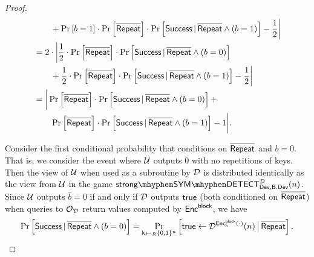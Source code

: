 \begin{proof}
\begin{align}
	& \qquad + \prob{b=1}\cdot\prob{\pneg{\rep}}\cdot \condprob{\success}{\pneg{\rep}\pand(b=1)} - \frac{1}{2} \bigg\vert \nonumber \\ 
	& = 2\cdot\bigg\vert \frac{1}{2}\cdot\prob{\pneg{\rep}}\cdot \condprob{\success}{\pneg{\rep}\pand(b=0)} \nonumber \\
	& \qquad + \frac{1}{2}\cdot\prob{\pneg{\rep}}\cdot \condprob{\success}{\pneg{\rep}\pand(b=1)} - \frac{1}{2} \bigg\vert \nonumber \\
	& = \bigg\vert \prob{\pneg{\rep}}\cdot \condprob{\success}{\pneg{\rep}\pand(b=0)} + \nonumber \\
\label{eq:7_2}	& \qquad \prob{\pneg{\rep}}\cdot\condprob{\success}{\pneg{\rep}\pand(b=1)} - 1 \bigg\vert.
\end{align}

Consider the first conditional probability that conditions on $\pneg{\rep}$ and $b = 0$. That is, we consider the event where $\user$ outputs $0$ with no repetitions of keys. Then the view of $\user$ when used as a subroutine by $\dist$ is distributed identically as the view from $\user$ in the game $\symstrongdetect{\dev}{\bbdev}{\dist}$. Since $\user$ outputs $\hat{b} = 0$ if and only if $\dist$ outputs $\true$ (both conditioned on $\pneg{\rep}$) when queries to $\oracle_{\dist}$ return values computed by $\EncBlock$, we have
\begin{align*}
	\condprob{\success}{\pneg{\rep}\pand(b=0)} = \condprobb{\true\leftarrow\dist^{\Enc{\key}(\cdot)}(n)}{\pneg{\rep}}{\key\unileft\{0,1\}^n}.
\end{align*}


\end{proof}
